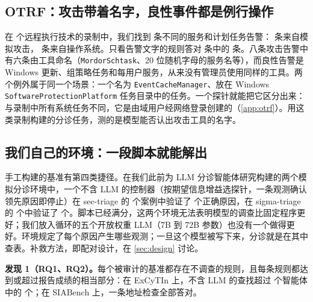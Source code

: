 \subsection{OTRF：攻击带着名字，良性事件都是例行操作}
\label{sec:otrf}

在 \otRec{} 个远程执行技术的录制中，我们找到 \otN{} 条不同的服务和计划任务告警：\otAttack{} 条来自模拟攻击，\otBenign{} 条来自操作系统。只看告警文字的规则答对 \otN{} 条中的 \otRuleCorrect{} 条。八条攻击告警中有六条由工具命名（\texttt{MordorSchtask}、20 位随机字母的服务名等），而良性告警是 Windows 更新、组策略任务和每用户服务，从来没有管理员使用同样的工具。两个例外属于同一个场景：一个名为 \texttt{EventCacheManager}、放在 Windows \texttt{SoftwareProtectionPlatform} 任务目录中的任务。一个探针就能把它区分出来：与录制中所有系统任务不同，它是由域用户经网络登录创建的（\cref{app:otrf}）。用这类录制构建的分诊任务，测的是模型能否认出攻击工具的名字。

\subsection{我们自己的环境：一段脚本就能解出}
\label{sec:own}

手工构建的基准有第四类捷径。在我们此前为 LLM 分诊智能体研究构建的两个模拟分诊环境中，一个不含 LLM 的控制器（按期望信息增益选探针，一条观测确认领先原因即停止）在 sec-triage 的 \envSecN{} 个案例中验证了 \envSec{} 个正确原因，在 sigma-triage 的 \envSigmaN{} 个中验证了 \envSigma{} 个。脚本已经满分，这两个环境无法表明模型的调查比固定程序更好；我们放入循环的五个开放权重 LLM（7B 到 72B 参数）也没有一个做得更好。环境规定了每个原因产生哪些观测；一旦这个模型被写下来，分诊就是在其中查表。补救方法，即配对设计，在 \cref{sec:design} 讨论。

\smallskip\noindent\textbf{发现 1（RQ1、RQ2）。}每个被审计的基准都存在不调查的规则，且每条规则都达到或超过报告成绩的相当部分：在 ExCyTIn 上，不含 LLM 的查找超过 \oModels{} 个智能体中的 \oBelowGraph{} 个；在 SIABench 上，一条地址检查全部答对。
